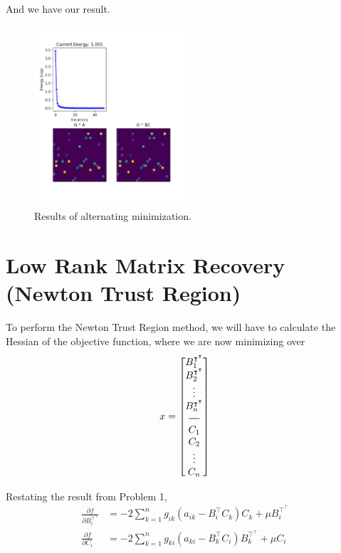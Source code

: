 \documentclass[a4paper]{article}
\newcommand*{\horzbar}{\rule[.5ex]{2.5ex}{0.5pt}}
\begin{document}
And we have our result.

\begin{figure}[!h]
\centering
\includegraphics[width=0.5\textwidth]{low_rank_am.png}
\caption{Results of alternating minimization.}
\end{figure}


\section{Low Rank Matrix Recovery (Newton Trust Region)}

To perform the Newton Trust Region method, we will have to calculate the Hessian of the objective function, where we are now minimizing over
\begin{align*}
    x = \begin{bmatrix}
        B_1^{\intercal^\intercal} \\
        B_2^{\intercal^\intercal} \\
        \vdots \\
        B_n^{\intercal^\intercal} \\
        \horzbar \\
        C_1 \\
        C_2 \\
        \vdots \\
        C_n \\
        \end{bmatrix}
\end{align*}

Restating the result from Problem 1,
\begin{align*}
\frac{\partial f}{\partial B_i^{\intercal^\intercal}} &= -2 \sum_{k=1}^n g_{ik} (a_{ik} - B_i^\intercal C_k) C_k + \mu B_i^{\intercal^\intercal} \\
\frac{\partial f}{\partial C_i} &= -2 \sum_{k=1}^n g_{ki} (a_{ki} - B_k^\intercal C_i) B_k^{\intercal^\intercal} + \mu C_i
\end{align*}
\end{document}
